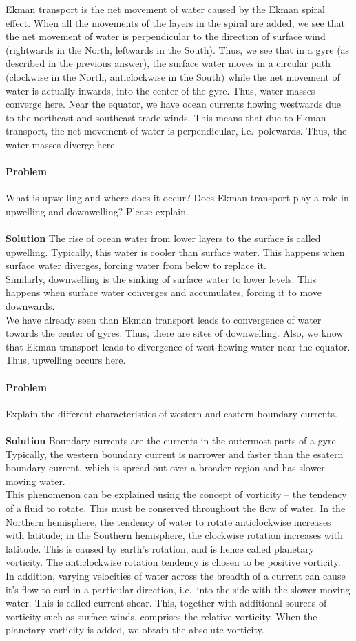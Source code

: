 \documentclass[10pt]{article}
\newcounter{prob}
\def\problem{\stepcounter{prob}\paragraph{Problem \arabic{prob}}}
\def\solution{\\\\\textbf{Solution }}
\begin{document}
        Ekman transport is the net movement of water caused by the Ekman spiral effect. When all the movements of the layers in the spiral are added,
        we see that the net movement of water is perpendicular to the direction of surface wind (rightwards in the North, leftwards in the South).
        Thus, we see that in a gyre (as described in the previous answer), the surface water moves in a circular path (clockwise in the North,
        anticlockwise in the South) while the net movement of water is actually inwards, into the center of the gyre.  Thus, water masses
        converge here. Near the equator, we have ocean currents flowing westwards due to the northeast and southeast trade winds. This means
        that due to Ekman transport, the net movement of water is perpendicular, i.e.\ polewards. Thus, the water masses diverge here.


        \problem What is upwelling and where does it occur? Does Ekman transport play a role in upwelling and downwelling? Please explain.
        \solution The rise of ocean water from lower layers to the surface is called upwelling. Typically, this water is cooler than surface
        water. This happens when surface water diverges, forcing water from below to replace it.\\

        Similarly, downwelling is the sinking of surface water to lower levels. This happens when surface water converges and accumulates, forcing
        it to move downwards. \\

        We have already seen than Ekman transport leads to convergence of water towards the center of gyres. Thus, there are sites of downwelling.
        Also, we know that Ekman transport leads to divergence of west-flowing water near the equator. Thus, upwelling occurs here.


        \problem Explain the different characteristics of western and eastern boundary currents.
        \solution Boundary currents are the currents in the outermost parts of a gyre. Typically, the western boundary current is narrower
        and faster than the esatern boundary current, which is spread out over a broader region and has slower moving water. \\

        This phenomenon can be explained using the concept of vorticity -- the tendency of a fluid to rotate. This must be conserved throughout the
        flow of water. In the Northern hemisphere, the tendency of water to rotate anticlockwise increases with latitude; in the Southern hemisphere,
        the clockwise rotation increases with latitude. This is caused by earth's rotation, and is hence called planetary vorticity.
        The anticlockwise rotation tendency is chosen to be positive vorticity. In addition, varying velocities of water across the breadth
        of a current can cause it's flow to curl in a particular direction, i.e.\ into the side with the slower moving water. This is called
        current shear. This, together with additional sources of vorticity such as surface winds, comprises the relative vorticity. When
        the planetary vorticity is added, we obtain the absolute vorticity.\\
        
\end{document}

